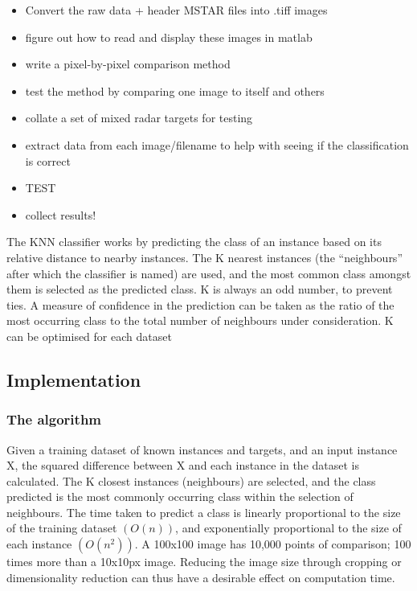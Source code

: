 \begin{itemize}
\item Convert the raw data + header MSTAR files into .tiff images
\item figure out how to read and display these images in matlab
\item write a pixel-by-pixel comparison method
\item test the method by comparing one image to itself and others
\item collate a set of mixed radar targets for testing
\item extract data from each image/filename to help with seeing if the classification is correct
\item TEST
\item collect results!
\end{itemize}




The KNN classifier works by predicting the class of an instance based on its relative distance to nearby instances. The K nearest instances (the ``neighbours'' after which the classifier is named) are used, and the most common class amongst them is selected as the predicted class. K is always an odd number, to prevent ties. A measure of confidence in the prediction can be taken as the ratio of the most occurring class to the total number of neighbours under consideration. K can be optimised for each dataset

\subsection{Implementation}
\subsubsection{The algorithm}
Given a training dataset of known instances and targets, and an input instance X, the squared difference between X and each instance in the dataset is calculated. The K closest instances (neighbours) are selected, and the class predicted is the most commonly occurring class within the selection of neighbours. The time taken to predict a class is linearly proportional to the size of the training dataset $(O(n))$, and exponentially proportional to the size of each instance $(O(n^2))$. A 100x100 image has 10,000 points of comparison; 100 times more than a 10x10px image. Reducing the image size through cropping or dimensionality reduction can thus have a desirable effect on computation time.

